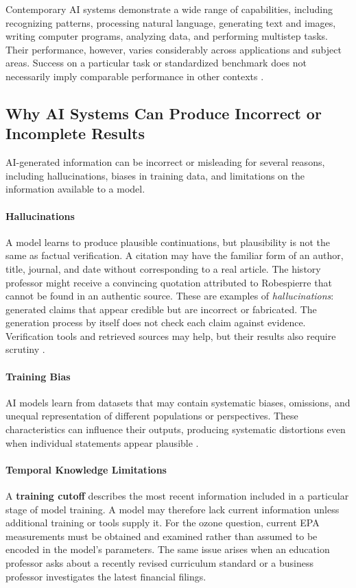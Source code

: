 \documentclass[11pt]{article}
\begin{document}
Contemporary AI systems demonstrate a wide range of
capabilities, including recognizing patterns, processing
natural language, generating text and images, writing
computer programs, analyzing data, and performing
multistep tasks. Their performance, however, varies
considerably across applications and subject areas.
Success on a particular task or standardized benchmark
does not necessarily imply comparable performance in
other contexts \citep{Bommasani2021,NIST2024GenAI}.

\subsection{Why AI Systems Can Produce Incorrect or Incomplete Results}

AI-generated information can be incorrect or misleading for
several reasons, including hallucinations, biases in training
data, and limitations on the information available to a model.

\paragraph{Hallucinations}
A model learns to produce plausible continuations, but plausibility
is not the same as factual verification. A citation may have the
familiar form of an author, title, journal, and date without
corresponding to a real article. The history professor might
receive a convincing quotation attributed to Robespierre that
cannot be found in an authentic source. These are examples of
\emph{hallucinations}: generated claims that appear credible but
are incorrect or fabricated. The generation process by itself
does not check each claim against evidence. Verification tools
and retrieved sources may help, but their results also require
scrutiny \citep{Ji2023Hallucination,NIST2024GenAI}.

\paragraph{Training Bias}
AI models learn from datasets that may contain
systematic biases, omissions, and unequal
representation of different populations or
perspectives. These characteristics can influence
their outputs, producing systematic distortions
even when individual statements appear plausible
\citep{Bender2021Parrots,NIST2024GenAI}.

\paragraph{Temporal Knowledge Limitations}
A \textbf{training cutoff} describes the most recent information
included in a particular stage of model training. A model may therefore
lack current information unless additional training or tools supply it.
For the ozone question, current EPA measurements must be obtained and
examined rather than assumed to be encoded in the model's parameters.
The same issue arises when an education professor asks about a recently
revised curriculum standard or a business professor investigates the
latest financial filings.
\end{document}
